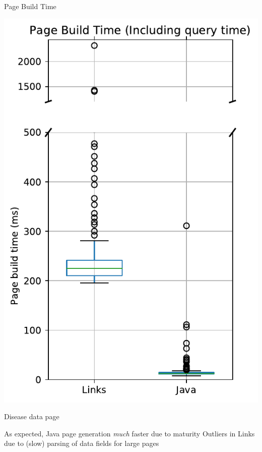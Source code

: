 \documentclass[11.5pt, aspectratio=169]{beamer}
\begin{document}
\begin{frame}{Page Build Time}
\begin{minipage}[t]{0.45\textwidth}
    \includegraphics[scale=0.3]{images/diseasedisplay_pagebuild_incl_box.pdf}

    \begin{center}
      Disease data page
    \end{center}
  \end{minipage}
  \vspace{1em}

  \begin{fullpageitemize}
  \itemR As expected, Java page generation \emph{much} faster due to maturity
  \itemR Outliers in Links due to (slow) parsing of data fields for large pages
  \end{fullpageitemize}
\end{frame}
\end{document}
